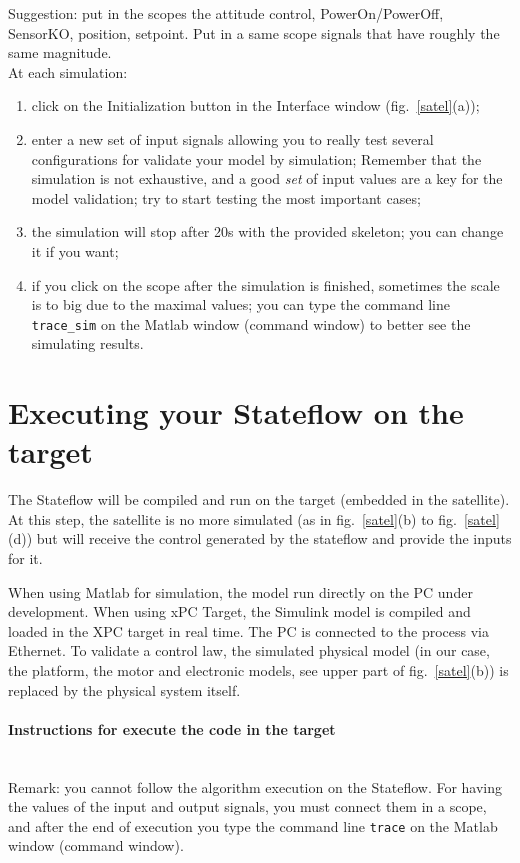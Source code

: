 \documentclass[a4paper]{article}
\begin{document}
Suggestion: put in the scopes the attitude control, PowerOn/PowerOff, SensorKO, position, setpoint. 
Put in a same scope signals that have roughly the same magnitude.\\

At each simulation:
\begin{enumerate}
\item click on the Initialization button in the Interface window (fig.~\ref{satel}(a));
\item enter a new set of input signals allowing you to really test several configurations for
	validate your model by simulation; Remember that the simulation is not exhaustive, and a good
	{\it set} of input values are a key for the model validation; try to start testing the most
	important cases;
\item the simulation will stop after 20s with the provided skeleton; you can change it if you want;
\item if you click on the scope after the simulation is finished, sometimes the scale is to big
	due to the maximal values; you can type the command line {\tt trace\_sim} on the Matlab window
	(command window) to better see the simulating results.
\end{enumerate}

\section{Executing your Stateflow on the target}

The Stateflow will be compiled and run on the target (embedded in the satellite).
At this step, the satellite is no more simulated (as in  fig.~\ref{satel}(b) to 
fig.~\ref{satel}(d)) but will receive the control generated by the stateflow and provide the 
inputs for it.%

When using Matlab for simulation, the model run directly on the PC under development.
When using xPC Target, the Simulink model is compiled and loaded in the XPC target in real time. 
The PC is connected to the process via Ethernet. To validate a control law, the simulated physical
model (in our case, the platform, the motor and electronic models, see upper part of
fig.~\ref{satel}(b)) is replaced by the physical system itself.%

\paragraph{Instructions for execute the code in the target}~\\
Remark: you cannot follow the algorithm execution on the Stateflow. For having the values of the
input and output signals, you must connect them in a scope, and after the end of execution you type
the command line {\tt trace} on the Matlab window (command window).\\
\end{document}
